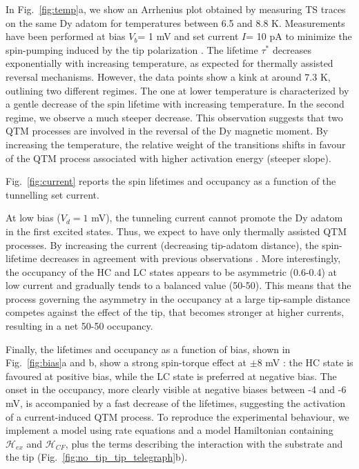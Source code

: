 \documentclass[
reprint,amsmath,amssymb,aps]{revtex4-2}
\begin{document}
In Fig.~\ref{fig:temp}a, we show an Arrhenius plot obtained by measuring TS traces on the same Dy adatom for temperatures between 6.5 and 8.8 K. Measurements have been performed at bias $V_b$= 1 mV and set current $I$= 10 pA to minimize the spin-pumping induced by the tip polarization \cite{Khajetoorians2013,paul_ControlMillisecondSpin_2017}. The lifetime $\tau^{*}$ decreases exponentially with increasing temperature, as expected for thermally assisted reversal mechanisms. However, the data points show a kink at around 7.3 K, outlining two different regimes. The one at lower temperature is characterized by a gentle decrease of the spin lifetime with increasing temperature. In the second regime, we observe a much steeper decrease. This observation suggests that two QTM processes are involved in the reversal of the Dy magnetic moment. By increasing the temperature, the relative weight of the transitions shifts in favour of the QTM process associated with higher activation energy (steeper slope).

Fig.~\ref{fig:current} reports the spin lifetimes and occupancy as a function of the tunnelling set current. 

At low bias ($V_d=1$ mV), the tunneling current cannot promote the Dy adatom in the first excited states. Thus, we expect to have only thermally assisted QTM processes. By increasing the current (decreasing tip-adatom distance), the spin-lifetime decreases in agreement with previous observations \cite{paul_ControlMillisecondSpin_2017,Khajetoorians2013,krause_joule_2011}. More interestingly, the occupancy of the HC and LC states appears to be asymmetric (0.6-0.4) at low current and gradually tends to a balanced value (50-50). This means that the process governing the asymmetry in the occupancy at a large tip-sample distance competes against the effect of the tip, that becomes stronger at higher currents, resulting in a net 50-50 occupancy.

Finally, the lifetimes and occupancy as a function of bias, shown in Fig.~\ref{fig:bias}a and b, show a strong spin-torque effect at $\pm$8 mV \cite{Khajetoorians2013,delgadoSpinTransferTorqueSingle2010,balashovInelasticElectronmagnonInteraction2008,krause_joule_2011}: the HC state is favoured at positive bias, while the LC state is preferred at negative bias. The onset in the occupancy, more clearly visible at negative biases between -4 and -6 mV, is accompanied by a fast decrease of the lifetimes, suggesting the activation of a current-induced QTM process.
To reproduce the experimental behaviour, we implement a model using rate equations and a model Hamiltonian containing $\mathcal{H}_{ex}$ and $\mathcal{H}_{CF}$, plus the terms describing the interaction with the substrate and the tip (Fig.~\ref{fig:no_tip_tip_telegraph}b).
\end{document}
